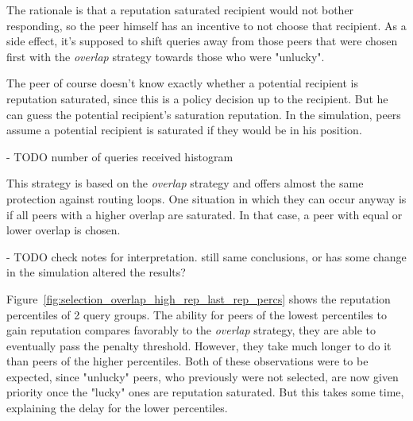 The rationale is that a reputation saturated recipient would not
bother responding, so the peer himself has an incentive to not choose that
recipient. As a side effect, it's supposed to shift queries away from those
peers that were chosen first with the \emph{overlap} strategy towards those who
were "unlucky".

The peer of course doesn't know exactly whether a potential recipient is
reputation saturated, since this is a policy decision up to the recipient. But
he can guess the potential recipient's saturation reputation. In the simulation,
peers assume a potential recipient is saturated if they would be in his
position.

- TODO number of queries received histogram

This strategy is based on the \emph{overlap} strategy and offers almost the same
protection against routing loops. One situation in which they can occur anyway
is if all peers with
a higher overlap are saturated. In that case, a peer with equal or lower overlap
is chosen.

- TODO check notes for interpretation. still same conclusions, or has some
  change in the simulation altered the results?

Figure~\ref{fig:selection_overlap_high_rep_last_rep_percs} shows the reputation
percentiles of 2 query groups. The ability for peers of the lowest percentiles
to gain reputation compares favorably to the \emph{overlap} strategy, they are
able to eventually pass the penalty threshold. However, they take much longer to
do it than peers of the higher percentiles. Both of these observations were to
be expected, since "unlucky" peers, who previously were not selected, are now
given priority once the "lucky" ones are reputation saturated. But this takes
some time, explaining the delay for the lower percentiles.

